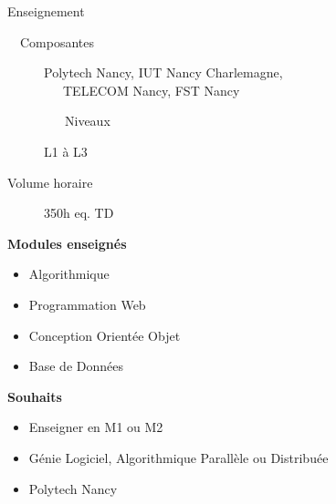 \documentclass[10pt]{beamer}
\begin{document}
\begin{frame}{Enseignement}
  \begin{description}
    \item[~~Composantes] Polytech Nancy, IUT Nancy Charlemagne,
      \\
      ~~~TELECOM Nancy, FST Nancy
    \item[~~~~~~~~~Niveaux] L1 à L3
    \item[Volume horaire] 350h eq. TD
  \end{description}
  \textbf{Modules enseignés}
  \begin{itemize}
    \item Algorithmique
    \item Programmation Web
    \item Conception Orientée Objet
    \item Base de Données
  \end{itemize}
  \textbf{Souhaits}
  \begin{itemize}
    \item Enseigner en M1 ou M2
    \item Génie Logiciel, Algorithmique Parallèle ou Distribuée
    \item Polytech Nancy
  \end{itemize}
\end{frame}
\end{document}
